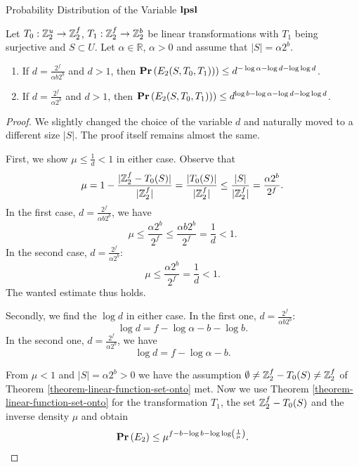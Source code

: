 \begin{section}{Probability Distribution of the Variable \texorpdfstring{$\mathbf{lpsl}$}{lpsl}}
\begin{statement}
\label{statement-e2-probability-linear-good}
Let $T_0: \mathbb{Z}_{2}^{u} \rightarrow \mathbb{Z}_{2}^{f}$, $T_1: \mathbb{Z}_{2}^{f} \rightarrow \mathbb{Z}_{2}^{b}$ be linear transformations with $T_1$ being surjective and $S \subset U$. Let $\alpha \in \mathbb{R}$, $\alpha > 0$ and assume that $|S| = \alpha 2 ^ b$.
\begin{enumerate}
\item If $d = \frac{2 ^ f}{\alpha b 2 ^ b}$ and $d > 1$, then $\mathbf{Pr}\left(E_2(S, T_0, T_1))\right) \leq d ^ {-\log \alpha - \log d - \log \log d}$.
\item If $d = \frac{2 ^ f}{\alpha 2 ^ b}$ and $d > 1$, then $\mathbf{Pr}\left(E_2(S, T_0, T_1))\right) \leq d ^ {\log b - \log \alpha - \log d - \log \log d}$.
\end{enumerate}
\end{statement}
\begin{proof}
We slightly changed the choice of the variable $d$ and naturally moved to a different size $|S|$. The proof itself remains almost the same.

First, we show $\mu \leq \frac{1}{d} < 1$ in either case. Observe that
\[
	\mu = 1 - \frac{|\mathbb{Z}_{2}^{f} - T_0(S)|}{|\mathbb{Z}_{2}^{f}|} = \frac{|T_0(S)|}{|\mathbb{Z}_{2}^{f}|} \leq \frac{|S|}{|\mathbb{Z}_{2}^{f}|} = \frac{\alpha 2 ^ b}{2 ^ f} \text{.}
\]
In the first case, $d = \frac{2 ^ f}{\alpha b 2 ^ b}$, we have
\[
	\mu \leq \frac{\alpha 2 ^ b}{2 ^ f} \leq \frac{\alpha b 2 ^ b}{2 ^ f} = \frac{1}{d} < 1 \text{.}
\]
In the second case, $d = \frac{2 ^ f}{\alpha 2 ^ b}$:
\[
	\mu \leq \frac{\alpha 2 ^ b}{2 ^ f} = \frac{1}{d} < 1 \text{.}
\]
The wanted estimate thus holds.

Secondly, we find the $\log d$ in either case. In the first one, $d = \frac{2 ^ f}{\alpha b 2 ^ b}$:
\[
	\log d = f - \log \alpha - b - \log b \text{.}
\]
In the second one, $d = \frac{2 ^ f}{\alpha 2 ^ b}$, we have
\[
	\log d = f - \log \alpha - b \text{.}
\]

From $\mu < 1$ and $|S| = \alpha 2^b > 0$ we have the assumption $\emptyset \neq \mathbb{Z}_{2}^{f} - T_0(S) \neq \mathbb{Z}_{2}^{f}$ of Theorem \ref{theorem-linear-function-set-onto} met. Now we use Theorem \ref{theorem-linear-function-set-onto} for the transformation $T_1$, the set $\mathbb{Z}_{2}^{f} - T_0(S)$ and the inverse density $\mu$ and obtain
\[
	\mathbf{Pr}\left(E_2\right) \leq \mu ^ {f - b - \log b - \log \log \left( \frac{1}{\mu} \right)} \text{.}
\]


\end{proof}
\end{section}
